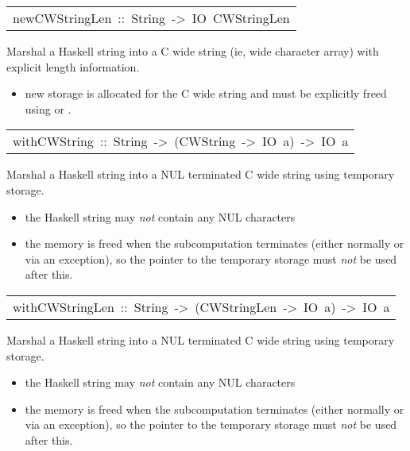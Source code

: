 \begin{haddockdesc}
\item[\begin{tabular}{@{}l}
newCWStringLen\ ::\ String\ ->\ IO\ CWStringLen
\end{tabular}]\haddockbegindoc
Marshal a Haskell string into a C wide string (ie, wide character array)
 with explicit length information.
\par
\begin{itemize}
\item
 new storage is allocated for the C wide string and must
   be explicitly freed using  or
   .
\par

\end{itemize}

\end{haddockdesc}
\begin{haddockdesc}
\item[\begin{tabular}{@{}l}
withCWString\ ::\ String\ ->\ (CWString\ ->\ IO\ a)\ ->\ IO\ a
\end{tabular}]\haddockbegindoc
Marshal a Haskell string into a NUL terminated C wide string using
 temporary storage.
\par
\begin{itemize}
\item
 the Haskell string may \emph{not} contain any NUL characters
\par

\item
 the memory is freed when the subcomputation terminates (either
   normally or via an exception), so the pointer to the temporary
   storage must \emph{not} be used after this.
\par

\end{itemize}

\end{haddockdesc}
\begin{haddockdesc}
\item[\begin{tabular}{@{}l}
withCWStringLen\ ::\ String\ ->\ (CWStringLen\ ->\ IO\ a)\ ->\ IO\ a
\end{tabular}]\haddockbegindoc
Marshal a Haskell string into a NUL terminated C wide string using
 temporary storage.
\par
\begin{itemize}
\item
 the Haskell string may \emph{not} contain any NUL characters
\par

\item
 the memory is freed when the subcomputation terminates (either
   normally or via an exception), so the pointer to the temporary
   storage must \emph{not} be used after this.
\par

\end{itemize}

\end{haddockdesc}